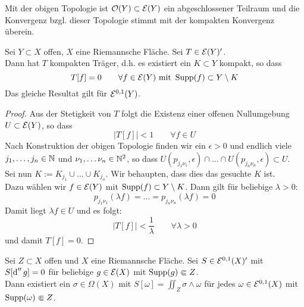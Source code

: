 \begin{cor}
  Mit der obigen Topologie ist $\mathcal{O}(Y) \subset \mathcal{E}(Y)$ ein
  abgeschlossener Teilraum und die Konvergenz bzgl. dieser Topologie
  stimmt mit der kompakten Konvergenz überein.
\end{cor}

\begin{lemma}
  \label{lemma:kompakter-träger-funktional}
  Sei $Y \subset X$ offen, $X$ eine Riemannsche Fläche. Sei $T \in
  \mathcal{E}(Y)'$. \\
  Dann hat $T$ kompakten Träger, d.h. es existiert ein $K \subset Y$
  kompakt, so dass
  \[
  T[f] = 0 \qquad \forall f \in \mathcal{E}(Y) \text{ mit } \operatorname{Supp}(f) \subset
  Y \setminus K
  \]
  Das gleiche Resultat gilt für $\mathcal{E}^{0,1}(Y)$.
\end{lemma}

\begin{proof}
  Aus der Stetigkeit von $T$ folgt die Existenz einer offenen
  Nullumgebung $U \subset \mathcal{E}(Y)$, so dass
  \[
  |T[f]| < 1 \qquad \forall f \in U
  \]
  Nach Konstruktion der obigen Topologie finden wir ein $\epsilon > 0$
  und endlich viele $j_1, \dots, j_n \in \mathbb{N}$ und $\nu_1, \dots \nu_n
  \in \mathbb{N}^2$, so dass $U(p_{j_1\nu_1}, \epsilon) \cap \dots \cap
  U(p_{j_n\nu_n}, \epsilon) \subset U$. \\
  Sei nun  $K := K_{j_1} \cup \dots \cup K_{j_n}$. Wir behaupten, dass
  dies das gesuchte $K$ ist. \\
  Dazu wählen wir $f \in \mathcal{E}(Y)$ mit $\operatorname{Supp}(f) \subset Y \setminus
  K$. Dann gilt für beliebige
  $\lambda > 0$:
  \[
  p_{j_1\nu_1}(\lambda f) = \dots = p_{j_n\nu_n}(\lambda f) = 0
  \]
  Damit liegt $\lambda f \in U$ und es folgt:
  \[
  |T[f]| < \frac1\lambda \qquad \forall \lambda >0
  \]
  und damit $T[f] = 0$.
\end{proof}

\begin{lemma}
  \label{lemma:Funktional-explizit}
  Sei $Z \subset X$ offen und $X$ eine Riemannsche Fläche. Sei $S \in
  \mathcal{E}^{0,1}(X)'$ mit $S[\d[''g]] = 0$ für beliebige $g \in \mathcal{E}(X)$
  mit $\operatorname{Supp}(g) \Subset Z$. \\
  Dann existiert ein $\sigma \in \Omega(X)$ mit $S[\omega] = \iint_Z
  \sigma \wedge \omega$ für jedes $\omega \in \mathcal{E}^{0,1}(X)$ mit
  $\operatorname{Supp}(\omega) \Subset Z$.
\end{lemma}

